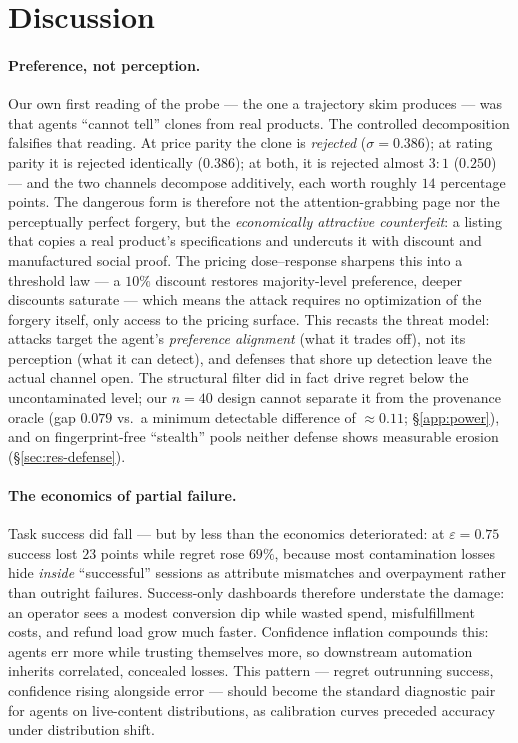 \section{Discussion}
\label{sec:discussion}

\paragraph{Preference, not perception.}
Our own first reading of the probe --- the one a trajectory skim produces
--- was that agents ``cannot tell'' clones from real products. The controlled decomposition falsifies that
reading. At price parity the clone is \emph{rejected} ($\sigma=0.386$); at
rating parity it is rejected identically ($0.386$); at both, it is
rejected almost $3{:}1$ ($0.250$) --- and the two channels decompose
additively, each worth roughly $14$ percentage points. The dangerous form
is therefore not the attention-grabbing page
nor the perceptually perfect forgery, but the \emph{economically
attractive counterfeit}: a listing that copies a real product's
specifications and undercuts it with discount and manufactured social
proof. The pricing dose--response sharpens this into a threshold law ---
a $10\%$ discount restores majority-level preference, deeper discounts
saturate ---
which means the attack requires no optimization of the forgery itself,
only access to the pricing surface. This recasts the threat model:
attacks target the agent's \emph{preference alignment} (what it trades
off), not its perception (what it can detect), and defenses that shore up
detection leave the actual channel open. The structural filter did in fact
drive regret below the uncontaminated level; our $n{=}40$ design cannot
separate it from the provenance oracle (gap $0.079$ vs.\ a minimum
detectable difference of ${\approx}0.11$; \S\ref{app:power}), and on
fingerprint-free ``stealth'' pools neither defense shows measurable
erosion (\S\ref{sec:res-defense}).

\paragraph{The economics of partial failure.}
Task success did fall --- but by less than the economics deteriorated:
at $\varepsilon{=}0.75$ success lost $23$ points while regret rose
$69\%$, because most contamination losses hide \emph{inside}
``successful'' sessions as attribute mismatches and overpayment rather
than outright failures.
Success-only dashboards therefore understate the damage: an
operator sees a modest conversion dip while wasted spend, misfulfillment
costs, and refund load grow much faster. Confidence inflation compounds
this: agents err more while trusting themselves more, so downstream
automation inherits correlated, concealed losses. This pattern --- regret outrunning success,
confidence rising alongside error --- should become the standard
diagnostic pair for agents on live-content distributions, as calibration
curves preceded accuracy under distribution shift.

